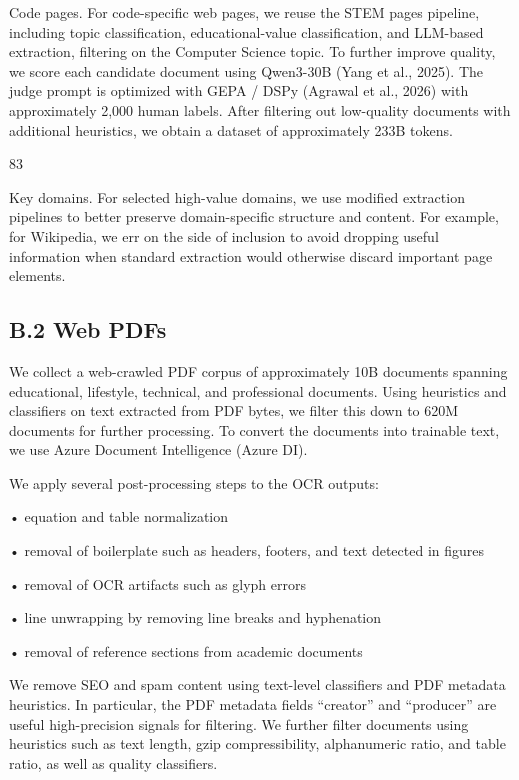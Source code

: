 \documentclass[
  10
]{article}
\begin{document}
Code pages. For code-specific web pages, we reuse the STEM pages
pipeline, including topic classification, educational-value
classification, and LLM-based extraction, filtering on the Computer
Science topic. To further improve quality, we score each candidate
document using Qwen3-30B (Yang et al., 2025). The judge prompt is
optimized with GEPA / DSPy (Agrawal et al., 2026) with approximately
2,000 human labels. After filtering out low-quality documents with
additional heuristics, we obtain a dataset of approximately 233B tokens.

83

Key domains. For selected high-value domains, we use modified extraction
pipelines to better preserve domain-specific structure and content. For
example, for Wikipedia, we err on the side of inclusion to avoid
dropping useful information when standard extraction would otherwise
discard important page elements.

\subsection{B.2 Web PDFs}\label{b.2-web-pdfs}

We collect a web-crawled PDF corpus of approximately 10B documents
spanning educational, lifestyle, technical, and professional documents.
Using heuristics and classifiers on text extracted from PDF bytes, we
filter this down to 620M documents for further processing. To convert
the documents into trainable text, we use Azure Document Intelligence
(Azure DI).

We apply several post-processing steps to the OCR outputs:

• equation and table normalization

• removal of boilerplate such as headers, footers, and text detected in
figures

• removal of OCR artifacts such as glyph errors

• line unwrapping by removing line breaks and hyphenation

• removal of reference sections from academic documents

We remove SEO and spam content using text-level classifiers and PDF
metadata heuristics. In particular, the PDF metadata fields ``creator''
and ``producer'' are useful high-precision signals for filtering. We
further filter documents using heuristics such as text length, gzip
compressibility, alphanumeric ratio, and table ratio, as well as quality
classifiers.
\end{document}
